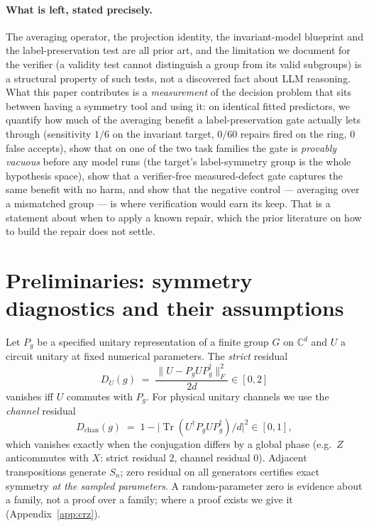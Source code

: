 \documentclass[11pt]{article}
\newcommand{\Dc}{D_{\mathrm{chan}}}
\begin{document}
\paragraph{What is left, stated precisely.} The averaging operator, the projection identity,
the invariant-model blueprint and the label-preservation test are all prior art, and the
limitation we document for the verifier (a validity test cannot distinguish a group from its
valid subgroups) is a structural property of such tests, not a discovered fact about LLM
reasoning. What this paper contributes is a \emph{measurement} of the decision problem that
sits between having a symmetry tool and using it: on identical fitted predictors, we quantify
how much of the averaging benefit a label-preservation gate actually lets through
(sensitivity $1/6$ on the invariant target, $0/60$ repairs fired on the ring, $0$ false
accepts), show that on one of the two task families the gate is \emph{provably vacuous} before
any model runs (the target's label-symmetry group is the whole hypothesis space), show that a
verifier-free measured-defect gate captures the same benefit with no harm, and show that the
negative control --- averaging over a mismatched group --- is where verification would earn
its keep. That is a statement about when to apply a known repair, which the prior literature
on how to build the repair does not settle.

\section{Preliminaries: symmetry diagnostics and their assumptions}
\label{sec:math}

Let $P_g$ be a specified unitary representation of a finite group $G$ on
$\mathbb{C}^{d}$ and $U$ a circuit unitary at fixed numerical parameters. The
\emph{strict} residual
\begin{equation}
  D_U(g) \;=\; \frac{\lVert U - P_g U P_g^{\dagger}\rVert_F^2}{2d}\in[0,2]
\end{equation}
vanishes iff $U$ commutes with $P_g$. For physical unitary channels we use the
\emph{channel} residual
\begin{equation}
  \Dc(g) \;=\; 1 - \bigl|\operatorname{Tr}(U^{\dagger} P_g U P_g^{\dagger})/d\bigr|^2 \in [0,1],
\end{equation}
which vanishes exactly when the conjugation differs by a global phase (e.g.\ $Z$
anticommutes with $X$: strict residual $2$, channel residual $0$). Adjacent
transpositions generate $S_n$; zero residual on all generators certifies exact symmetry
\emph{at the sampled parameters}. A random-parameter zero is evidence about a family, not
a proof over a family; where a proof exists we give it (Appendix~\ref{app:crz}).
\end{document}
